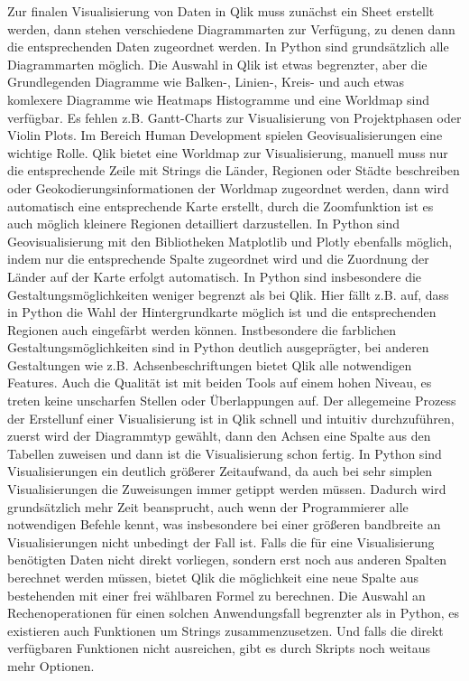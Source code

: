 \documentclass[12pt]{article}
\begin{document}
	Zur finalen Visualisierung von Daten in Qlik muss zunächst ein Sheet erstellt werden, dann stehen verschiedene Diagrammarten zur Verfügung, zu denen dann die entsprechenden Daten zugeordnet werden.
	In Python sind grundsätzlich alle Diagrammarten möglich. Die Auswahl in Qlik ist etwas begrenzter, aber die Grundlegenden Diagramme wie Balken-, Linien-, Kreis- und auch etwas komlexere Diagramme wie Heatmaps Histogramme und eine Worldmap sind verfügbar. Es fehlen z.B. Gantt-Charts zur Visualisierung von Projektphasen oder Violin Plots.
	Im Bereich Human Development spielen Geovisualisierungen eine wichtige Rolle. Qlik bietet eine Worldmap zur Visualisierung, manuell muss nur die entsprechende Zeile mit Strings die Länder, Regionen oder Städte beschreiben oder Geokodierungsinformationen der Worldmap zugeordnet werden, dann wird automatisch eine entsprechende Karte erstellt, durch die Zoomfunktion ist es auch möglich kleinere Regionen detailliert darzustellen. In Python sind Geovisualisierung mit den Bibliotheken Matplotlib und Plotly ebenfalls möglich, indem nur die entsprechende Spalte zugeordnet wird und die Zuordnung der Länder auf der Karte erfolgt automatisch. In Python sind insbesondere die Gestaltungsmöglichkeiten weniger begrenzt als bei Qlik. Hier fällt z.B. auf, dass in Python die Wahl der Hintergrundkarte möglich ist und die entsprechenden Regionen auch eingefärbt werden können.
	Instbesondere die farblichen Gestaltungsmöglichkeiten sind in Python deutlich ausgeprägter, bei anderen Gestaltungen wie z.B. Achsenbeschriftungen bietet Qlik alle notwendigen Features. Auch die Qualität ist mit beiden Tools auf einem hohen Niveau, es treten keine unscharfen Stellen oder Überlappungen auf. Der allegemeine Prozess der Erstellunf einer Visualisierung ist in Qlik schnell und intuitiv durchzuführen, zuerst wird der Diagrammtyp gewählt, dann den Achsen eine Spalte aus den Tabellen zuweisen und dann ist die Visualisierung schon fertig. In Python sind Visualisierungen ein deutlich größerer Zeitaufwand, da auch bei sehr simplen Visualisierungen die Zuweisungen immer getippt werden müssen. Dadurch wird grundsätzlich mehr Zeit beansprucht, auch wenn der Programmierer alle notwendigen Befehle kennt, was insbesondere bei einer größeren bandbreite an Visualisierungen nicht unbedingt der Fall ist. Falls die für eine Visualisierung benötigten Daten nicht direkt vorliegen, sondern erst noch aus anderen Spalten berechnet werden müssen, bietet Qlik die möglichkeit eine neue Spalte aus bestehenden mit einer frei wählbaren Formel zu berechnen. Die Auswahl an Rechenoperationen für einen solchen Anwendungsfall begrenzter als in Python, es existieren auch Funktionen um Strings zusammenzusetzen. Und falls die direkt verfügbaren Funktionen nicht ausreichen, gibt es durch Skripts noch weitaus mehr Optionen.
\end{document}
